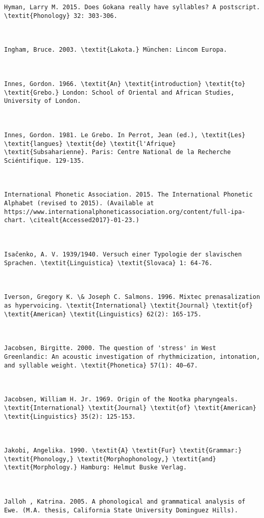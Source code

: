 \begin{verbatim}
Hyman, Larry M. 2015. Does Gokana really have syllables? A postscript. \textit{Phonology} 32: 303-306.



Ingham, Bruce. 2003. \textit{Lakota.} München: Lincom Europa.



Innes, Gordon. 1966. \textit{An} \textit{introduction} \textit{to} \textit{Grebo.} London: School of Oriental and African Studies, University of London.



Innes, Gordon. 1981. Le Grebo. In Perrot, Jean (ed.), \textit{Les} \textit{langues} \textit{de} \textit{l'Afrique} \textit{Subsaharienne}. Paris: Centre National de la Recherche Sciéntifique. 129-135.



International Phonetic Association. 2015. The International Phonetic Alphabet (revised to 2015). (Available at https://www.internationalphoneticassociation.org/content/full-ipa-chart. \citealt{Accessed2017}-01-23.)



Isačenko, A. V. 1939/1940. Versuch einer Typologie der slavischen Sprachen. \textit{Linguistica} \textit{Slovaca} 1: 64-76.



Iverson, Gregory K. \& Joseph C. Salmons. 1996. Mixtec prenasalization as hypervoicing. \textit{International} \textit{Journal} \textit{of} \textit{American} \textit{Linguistics} 62(2): 165-175.



Jacobsen, Birgitte. 2000. The question of 'stress' in West Greenlandic: An acoustic investigation of rhythmicization, intonation, and syllable weight. \textit{Phonetica} 57(1): 40–67.



Jacobsen, William H. Jr. 1969. Origin of the Nootka pharyngeals. \textit{International} \textit{Journal} \textit{of} \textit{American} \textit{Linguistics} 35(2): 125-153.



Jakobi, Angelika. 1990. \textit{A} \textit{Fur} \textit{Grammar:} \textit{Phonology,} \textit{Morphophonology,} \textit{and} \textit{Morphology.} Hamburg: Helmut Buske Verlag.



Jalloh , Katrina. 2005. A phonological and grammatical analysis of Ewe. (M.A. thesis, California State University Dominguez Hills).




\end{verbatim}
